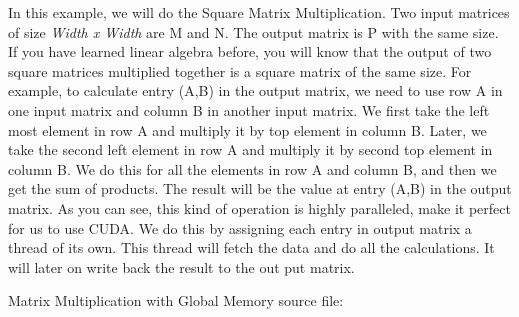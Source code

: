 \documentclass[letterpaper,10pt,openany,oneside]{sphinxmanual}
\begin{document}
In this example, we will do the Square Matrix Multiplication. Two input matrices of size \emph{Width x Width} are M and N. The output matrix is P with the same size. If you have learned linear algebra before, you will know that the output of two square matrices multiplied together is a square matrix of the same size. For example, to calculate entry (A,B) in the output matrix, we need to use row A in one input matrix and column B in another input matrix. We first take the left most element in row A and multiply it by top element in column B. Later, we take the second left element in row A and multiply it by second top element in column B. We do this for all the elements in row A and column B, and then we get the sum of products. The result will be the value at entry (A,B) in the output matrix. As you can see, this kind of operation is highly paralleled, make it perfect for us to use CUDA. We do this by assigning each entry in output matrix a thread of its own. This thread will fetch the data and do all the calculations. It will later on write back the result to the out put matrix.

Matrix Multiplication with Global Memory source file:
\end{document}

